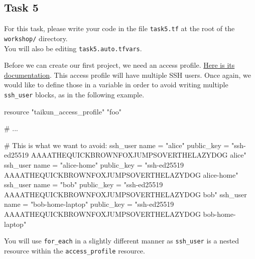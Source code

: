 \subsection{Task 5}\label{sec:task5}

\begin{note}
For this task, please write your code in the file \texttt{task5.tf}
at the root of the \texttt{workshop/} directory.\\
You will also be editing \texttt{task5.auto.tfvars}.
\end{note}

Before we can create our first project, we need an access profile.
\href{https://intuinewin.github.io/taikun-docs/resources/access_profile.html}{Here is its documentation}.
This access profile will have multiple SSH users. Once again, we would like
to define those in a variable in order to avoid writing multiple \texttt{ssh\_user} blocks, as in the following example.
\begin{tf}
resource "taikun_access_profile" "foo" {
  # ...

  # This is what we want to avoid:
  ssh_user {
      name       = "alice"
      public_key = "ssh-ed25519 AAAATHEQUICKBROWNFOXJUMPSOVERTHELAZYDOG alice"
  }
  ssh_user {
      name       = "alice-home"
      public_key = "ssh-ed25519 AAAATHEQUICKBROWNFOXJUMPSOVERTHELAZYDOG alice-home"
  }
  ssh_user {
      name       = "bob"
      public_key = "ssh-ed25519 AAAATHEQUICKBROWNFOXJUMPSOVERTHELAZYDOG bob"
  }
  ssh_user {
      name       = "bob-home-laptop"
      public_key = "ssh-ed25519 AAAATHEQUICKBROWNFOXJUMPSOVERTHELAZYDOG bob-home-laptop"
  }
}
\end{tf}

You will use \texttt{for\_each} in a slightly different manner as \texttt{ssh\_user} is a nested resource
within the \texttt{access\_profile} resource.

